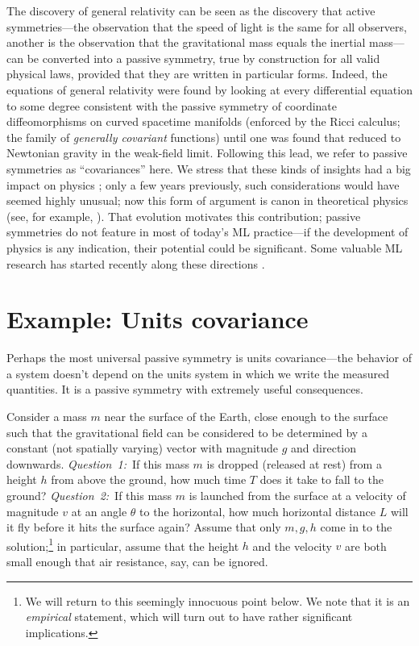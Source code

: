 \documentclass[preprint]{article} %
\begin{document}
The discovery of general relativity \citep{gr} can be seen as the discovery that active symmetries---the observation that the speed of light is the same for all observers, another is the observation that the gravitational mass equals the inertial mass---can be converted into a passive symmetry, true by construction for all valid physical laws, provided that they are written in particular forms.
Indeed, the equations of general relativity were found by looking at every differential equation to some degree consistent with the passive symmetry of coordinate diffeomorphisms on curved spacetime manifolds (enforced by the Ricci calculus; the family of \emph{generally covariant} functions) until one was found that reduced to Newtonian gravity in the weak-field limit.
Following this lead, we refer to passive symmetries as ``covariances'' here.
We stress that these kinds of insights had a big impact on physics \citep{EARMAN1978251};
only a few years previously, such considerations would have seemed highly unusual;
now this form of argument is canon in theoretical physics (see, for example, \citealt{zee2016group}).
That evolution motivates this contribution; passive symmetries do not feature in most of today's ML practice---if the development of physics is any indication, their potential could be significant.
Some valuable ML research has started recently along these directions \citep{weiler, bronstein2021geometric}.

\section{Example: Units covariance}\label{sec:units}
Perhaps the most universal passive symmetry is units covariance---the behavior of a system doesn't depend on the units system in which we write the measured quantities.
It is a passive symmetry with extremely useful consequences.

Consider a mass $m$ near the surface of the Earth, close enough to the surface such that the gravitational field can be considered to be determined by a constant (not spatially varying) vector with magnitude $g$ and direction downwards.
\textsl{Question~1:}~If this mass $m$ is dropped (released at rest) from a height $h$ from above the ground, how much time $T$ does it take to fall to the ground?
\textsl{Question~2:}~If this mass $m$ is launched from the surface at a velocity of magnitude $v$ at an angle $\theta$ to the horizontal, how much horizontal distance $L$ will it fly before it hits the surface again?
Assume that only $m, g, h$ come in to the solution;\footnote{We will return to this seemingly innocuous point below. We note that it is an \emph{empirical} statement, which will turn out to have rather significant implications.} in particular, assume that the height $h$ and the velocity $v$ are both small enough that air resistance, say, can be ignored.
\end{document}
